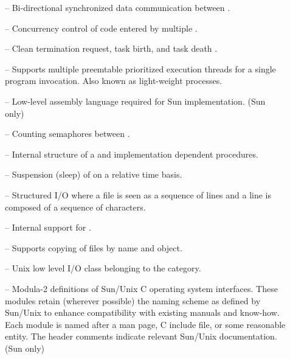 \begin{description}
\item[] --
    Bi-directional synchronized data communication between .

\item[] --
    Concurrency control of code entered by multiple .

\item[] --
    Clean termination request, task birth, and task death .

\item[] --
    Supports multiple preemtable prioritized execution threads
    for a single program invocation.  Also known as light-weight processes.

\item[] --
    Low-level assembly language required for Sun  implementation.
    (Sun only)

\item[] --
    Counting semaphores between . 

\item[] --
    Internal structure of a  and implementation dependent
    procedures.
    
\item[] --
    Suspension (sleep) of  on a relative time basis.
    
\item[] --
    Structured I/O where a file is seen as a sequence of lines and
    a line is composed of a sequence of characters.

\item[] --
    Internal support for .

\item[] --
    Supports copying of  files by name and object.
    
\item[] --
    Unix low level I/O class belonging to the  category.

\item[ ] -- Modula-2 definitions of Sun/Unix C operating
    system interfaces.  These modules retain (wherever possible) the
    naming scheme as defined by Sun/Unix to enhance compatibility with
    existing manuals and know-how.  Each module is named after a man
    page, C include file, or some reasonable entity.  The header
    comments indicate relevant Sun/Unix documentation.
    (Sun only)
    

\end{description}
